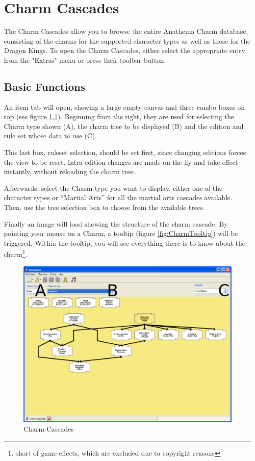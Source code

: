 \chapter{Charm Cascades}
\label{CharmCascades}
The Charm Cascades allow you to browse the entire Anathema Charm database, consisting of the charms for the supported character types as well as those for the Dragon Kings. To open the Charm Cascades, either select the appropriate entry from the "Extras" menu or press their toolbar button.

\section{Basic Functions}
An item tab will open, showing a large empty canvas and three combo boxes on top (see figure \ref{fig:CharmCascades}). Beginning from the right, they are used for selecting the Charm type shown (A), the charm tree to be displayed (B) and the edition and rule set whose data to use (C).

This last box, ruleset selection, should be set first, since changing editions forces the view to be reset. Intra-edition changes are made on the fly and take effect instantly, without reloading the charm tree.

Afterwards, select the Charm type you want to display, either one of the character types or ``Martial Arts'' for all the martial arts cascades available. Then, use the tree selection box to choose from the available trees.

Finally an image will load showing the structure of the charm cascade. By pointing your mouse on a Charm, a tooltip  (figure \ref{fig:CharmTooltip}) will be triggered. Within the tooltip, you will see everything there is to know about the charm\footnote{short of game effects, which are excluded due to copyright reasons}.

\begin{figure}[htbp]
	\centering
		\includegraphics[width=1.00\textwidth]{images/CharmCascades.png}
	\caption{Charm Cascades}
	\label{fig:CharmCascades}
\end{figure}


